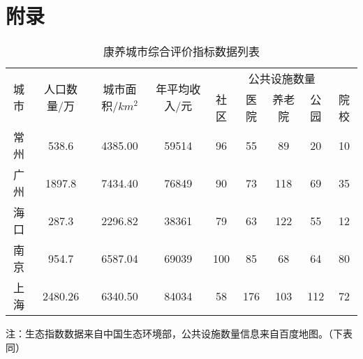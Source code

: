 \documentclass[12pt,a4paper]{article}
\begin{document}
\section*{附录}

\begin{table}[h]
  \centering
  \caption{康养城市综合评价指标数据列表}
  \begin{tabular}{c|c|c|c|ccccc}
    \toprule[2pt]
    \multirow{2}{*}{城市} & \multirow{2}{*}{人口数量/万} & \multirow{2}{*}{城市面积/$km^2$}& \multirow{2}{*}{年平均收入/元}& \multicolumn{5}{c}{公共设施数量} \\
\cline{5-9}
& & & & 社区 & 医院 & 养老院 & 公园 & 院校 \\
    \midrule[1pt]
    常州 & 538.6 & 4385.00 &59514& 96 & 55 & 89 & 20 & 10 \\
    广州 & 1897.8 & 7434.40 &76849& 90 & 73 & 118 & 69 & 35 \\
    海口 & 287.3 & 2296.82 &38361& 79 & 63 & 122 & 55 & 12 \\
    南京 & 954.7 & 6587.04 &69039& 100 & 85 & 68 & 64 & 80\\
    上海 & 2480.26 & 6340.50 &84034& 58 & 176 & 103 & 112 & 72 \\
    \bottomrule[2pt]
  \end{tabular}

  \vspace{0.5em}
  {\footnotesize 注：生态指数数据来自中国生态环境部，公共设施数量信息来自百度地图。（下表同）}
\end{table}
\end{document}
